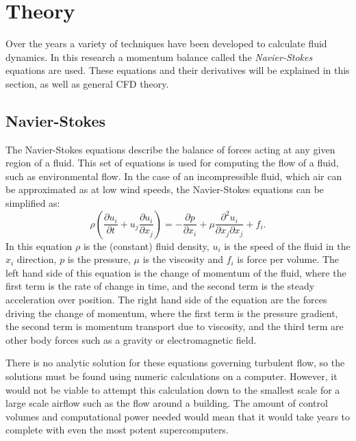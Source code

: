 \section{Theory}
\label{theory}

Over the years a variety of techniques have been developed to calculate fluid dynamics. In this research a momentum balance called the \emph{Navier-Stokes} equations are used. These equations and their derivatives will be explained in this section, as well as general CFD theory. 

\subsection{Navier-Stokes}

The Navier-Stokes equations describe the balance of forces acting at any given region of a fluid. This set of equations is used for computing the flow of a fluid, such as environmental flow. In the case of an incompressible fluid, which air can be approximated as at low wind speeds\cite{fundaero}, the Navier-Stokes equations can be simplified as:
\begin{equation}\label{eq:NS}
\rho \left( \frac{\partial u_i}{\partial t} + u_j \frac{\partial u_i}{\partial x_j} \right) = -\frac{\partial p}{\partial x_i} + \mu \frac{\partial^2 u_i}{\partial x_j \partial x_j} + f_i. 
\end{equation} 
In this equation $\rho$ is the (constant) fluid density, $u_i$ is the speed of the fluid in the $x_i$ direction, $p$ is the pressure, $\mu$ is the viscosity and $f_i$ is force per volume. The left hand side of this equation is the change of momentum of the fluid, where the first term is the rate of change in time, and the second term is the steady acceleration over position. The right hand side of the equation are the forces driving the change of momentum, where the first term is the pressure gradient, the second term is momentum transport due to viscosity, and the third term are other body forces such as a gravity or electromagnetic field.

There is no analytic solution for these equations governing turbulent flow, so the solutions must be found using numeric calculations on a computer. However, it would not be viable to attempt this calculation down to the smallest scale for a large scale airflow such as the flow around a building. The amount of control volumes and computational power needed would mean that it would take years to complete with even the most potent supercomputers. 

